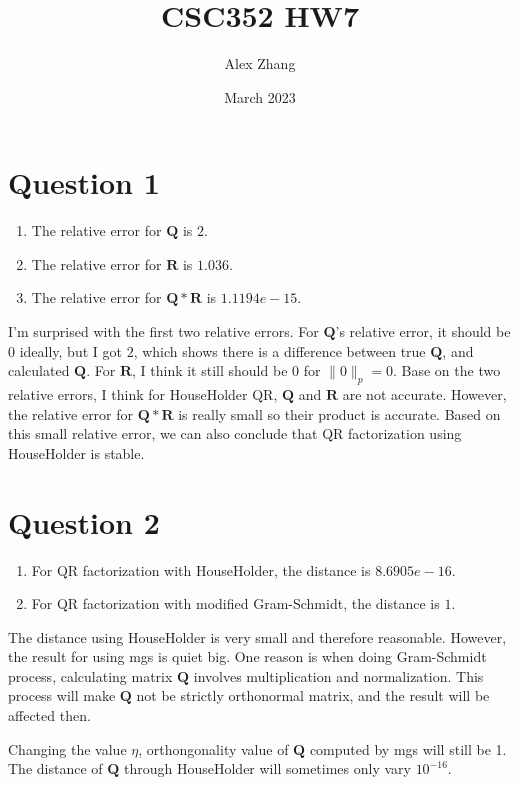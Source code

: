 \documentclass{article}
\title{CSC352 HW7}
\author{Alex Zhang}
\date{March 2023}
\newcommand{\mat}[1]{\mathbf{#1}}
\begin{document}
\maketitle

\section*{Question 1}
    \begin{enumerate}
        \item The relative error for $\mat{Q}$ is $2$.
        \item The relative error for $\mat{R}$ is $1.036$.
        \item The relative error for $\mat{Q*R}$ is $1.1194e-15$.
    \end{enumerate}

    I'm surprised with the first two relative errors. For $\mat{Q}$'s relative error, it should be $0$ ideally,
    but I got $2$, which shows there is a difference between true $\mat{Q}$, and calculated $\mat{Q}$. For $\mat{R}$, 
    I think it still should be $0$ for $\| 0\|_p = 0$. Base on the two relative errors, I think for HouseHolder QR, $\mat{Q}$ and $\mat{R}$ are not accurate.
    However, the relative error for $\mat{Q*R}$ is really small so their product is accurate. Based on this
    small relative error, we can also conclude that QR factorization using HouseHolder is stable.

\section*{Question 2}
    \begin{enumerate}
        \item For QR factorization with HouseHolder, the distance is $8.6905e-16$.
        \item For QR factorization with modified Gram-Schmidt, the distance is $1$.
    \end{enumerate}

    The distance using HouseHolder is very small and therefore reasonable. However, the result for using mgs is quiet big.
    One reason is when doing Gram-Schmidt process, calculating matrix $\mat{Q}$ involves multiplication and normalization.
    This process will make $\mat{Q}$ not be strictly orthonormal matrix, and the result will be affected then. 

    Changing the value $\eta$, orthongonality value of $\mat{Q}$ computed by mgs will still be 1.
    The distance of $\mat{Q}$ through HouseHolder will sometimes only vary $10^{-16}$.
\end{document}
